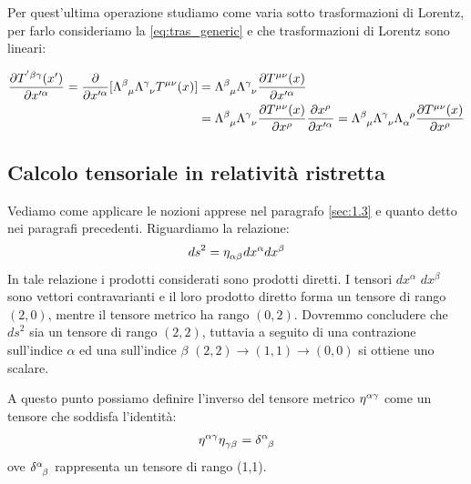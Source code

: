 Per quest'ultima operazione studiamo come varia sotto trasformazioni di Lorentz, per farlo consideriamo la \eqref{eq:tras_generic} e che trasformazioni di Lorentz sono lineari:

\begin{equation*}
\begin{split}
    \dfrac{\partial T\indices{^'^{\beta\gamma}}(x')}{\partial x'^\alpha}
= \dfrac{\partial }{\partial x'^\alpha}[\Lambda\indices{^\beta_\mu}\Lambda\indices{^\gamma_\nu} T\indices{^{\mu\nu}}(x)]
&= \Lambda\indices{^\beta_\mu}\Lambda\indices{^\gamma_\nu}\dfrac{\partial  T\indices{^{\mu\nu}}(x)}{\partial x'^\alpha} \\
&=\Lambda\indices{^\beta_\mu} \Lambda\indices{^\gamma_\nu}\dfrac{\partial T\indices{^{\mu\nu}}(x) }{\partial x^\rho}\dfrac{\partial x^\rho }{\partial x'^\alpha}
    =\Lambda\indices{^\beta_\mu} \Lambda\indices{^\gamma_\nu}\Lambda\indices{_\alpha^\rho}\dfrac{\partial T\indices{^{\mu\nu}}(x) }{\partial x^\rho}
\end{split}
\end{equation*}


\subsection{Calcolo tensoriale in relatività ristretta}\label{sec:1.4}
Vediamo come applicare le nozioni apprese nel paragrafo \ref{sec:1.3} e quanto detto nei paragrafi precedenti. Riguardiamo la relazione: 
\begin{equation*}
  {ds}^2=\eta\indices{_{\alpha\beta}}dx^\alpha dx^\beta
\end{equation*}
In tale relazione i prodotti considerati sono prodotti diretti. I tensori $dx^\alpha$ $dx^\beta$ sono vettori contravarianti e il loro prodotto diretto forma un tensore di rango $(2,0)$, mentre il tensore metrico ha rango $(0,2)$. Dovremmo concludere che ${ds}^2$ sia un tensore di rango $(2,2)$, tuttavia a seguito di una contrazione sull'indice $\alpha$ ed una sull'indice $\beta$ $(2,2)\rightarrow(1,1)\rightarrow(0,0)$ si ottiene uno scalare.

A questo punto possiamo definire l'inverso del tensore metrico $\eta\indices{^{\alpha \gamma}}$ come un tensore che soddisfa l'identità:
\begin{equation}
\eta\indices{^{\alpha \gamma}}\eta\indices{_{\gamma\beta}}=\delta\indices{^\alpha_\beta}
\end{equation}
ove $\delta\indices{^\alpha_\beta}$ rappresenta un tensore di rango (1,1).

